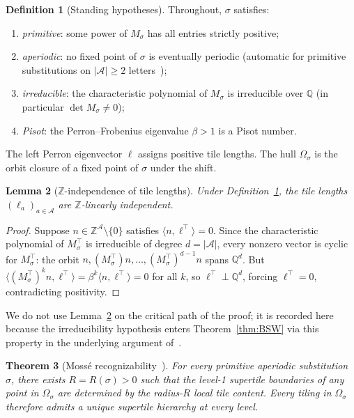 \documentclass[11pt]{article}
\theoremstyle{plain}
\newtheorem{theorem}{Theorem}[section]
\newtheorem{lemma}[theorem]{Lemma}
\theoremstyle{definition}
\newtheorem{definition}[theorem]{Definition}
\theoremstyle{remark}
\newcommand{\Z}{\mathbb{Z}}
\newcommand{\Q}{\mathbb{Q}}
\newcommand{\A}{\mathcal{A}}
\begin{document}
\begin{definition}[Standing hypotheses]\label{def:standing}
Throughout, $\sigma$ satisfies:
\begin{enumerate}[label=(\roman*)]
\item \emph{primitive}: some power of $M_\sigma$ has all entries strictly positive;
\item \emph{aperiodic}: no fixed point of $\sigma$ is eventually periodic (automatic for primitive substitutions on $|\A|\ge 2$ letters~\cite{Queffelec});
\item \emph{irreducible}: the characteristic polynomial of $M_\sigma$ is irreducible over $\Q$ (in particular $\det M_\sigma\ne 0$);
\item \emph{Pisot}: the Perron--Frobenius eigenvalue $\beta>1$ is a Pisot number.
\end{enumerate}
\end{definition}

The left Perron eigenvector $\ell$ assigns positive tile lengths. The hull $\Omega_\sigma$ is the orbit closure of a fixed point of $\sigma$ under the shift.

\begin{lemma}[$\Z$-independence of tile lengths]\label{lem:Z-indep}
Under Definition~\ref{def:standing}, the tile lengths $(\ell_a)_{a\in\A}$ are $\Z$-linearly independent.
\end{lemma}

\begin{proof}
Suppose $n\in\Z^\A\setminus\{0\}$ satisfies $\langle n,\ell^\top\rangle=0$. Since the characteristic polynomial of $M_\sigma^\top$ is irreducible of degree $d=|\A|$, every nonzero vector is cyclic for $M_\sigma^\top$: the orbit $n,(M_\sigma^\top)n,\dots,(M_\sigma^\top)^{d-1}n$ spans $\Q^d$. But $\langle (M_\sigma^\top)^k n,\ell^\top\rangle=\beta^k\langle n,\ell^\top\rangle=0$ for all $k$, so $\ell^\top\perp\Q^d$, forcing $\ell^\top=0$, contradicting positivity.
\end{proof}

We do not use Lemma~\ref{lem:Z-indep} on the critical path of the proof; it is recorded here because the irreducibility hypothesis enters Theorem~\ref{thm:BSW} via this property in the underlying argument of~\cite{BSW}.

\begin{theorem}[Moss\'e recognizability~\cite{Mosse1,Mosse2}]\label{thm:Mosse}
For every primitive aperiodic substitution $\sigma$, there exists $R=R(\sigma)>0$ such that the level-1 supertile boundaries of any point in $\Omega_\sigma$ are determined by the radius-$R$ local tile content. Every tiling in $\Omega_\sigma$ therefore admits a unique supertile hierarchy at every level.
\end{theorem}
\end{document}
